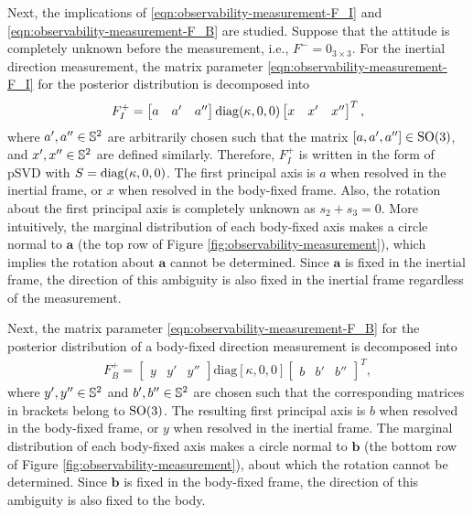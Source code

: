 Next, the implications of \eqref{eqn:observability-measurement-F_I} and \eqref{eqn:observability-measurement-F_B} are studied.
Suppose that the attitude is completely unknown before the measurement, i.e., $F^-=0_{3\times 3}$. 
For the inertial direction measurement, the matrix parameter \eqref{eqn:observability-measurement-F_I} for the posterior distribution is decomposed into
\begin{align} \label{eqn:observability-measurement-SVD_FI}
	F_I^+  = \begin{bmatrix} a & a' & a'' \end{bmatrix} 
	\mathrm{diag}(\kappa, 0,0) \begin{bmatrix} x & x' & x'' \end{bmatrix}^T,
\end{align}
where $a',a''\in\mathbb{S}^2$ are arbitrarily chosen such that the matrix $[a,a',a'']\in\mathrm{SO}(3)$, and $x',x''\in\mathbb{S}^2$ are defined similarly.
Therefore, $F_I^+$ is written in the form of pSVD with $S=\mathrm{diag}(\kappa,0,0)$. 
The first principal axis is $a$ when resolved in the inertial frame, or $x$ when resolved in the body-fixed frame. 
Also, the rotation about the first principal axis is completely unknown as $s_2+s_3 = 0$.
More intuitively, the marginal distribution of each body-fixed axis makes a circle normal to $\bm{a}$ (the top row of Figure \ref{fig:observability-measurement}), which implies the rotation about $\bm{a}$ cannot be determined.
Since $\bm{a}$ is fixed in the inertial frame, the direction of this ambiguity is also fixed in the inertial frame regardless of the measurement.

Next, the matrix parameter \eqref{eqn:observability-measurement-F_B} for the posterior distribution of a body-fixed direction measurement is decomposed into
\begin{align} \label{eqn:observability-measurement-SVD_FB}
	F_B^+  = \begin{bmatrix} y & y' & y'' \end{bmatrix} 
	\mathrm{diag}[\kappa, 0,0] \begin{bmatrix} b & b' & b'' \end{bmatrix}^T,
\end{align}
where $y',y''\in\mathbb{S}^2$ and $b',b''\in\mathbb{S}^2$ are chosen such that the corresponding matrices in brackets belong to $\mathrm{SO}(3)$. 
The resulting first principal axis is $b$ when resolved in the body-fixed frame, or $y$ when resolved in the inertial frame.
The marginal distribution of each body-fixed axis makes a circle normal to $\bm{b}$ (the bottom row of Figure \ref{fig:observability-measurement}), about which the rotation cannot be determined.
Since $\bm{b}$ is fixed in the body-fixed frame, the direction of this ambiguity is also fixed to the body.

